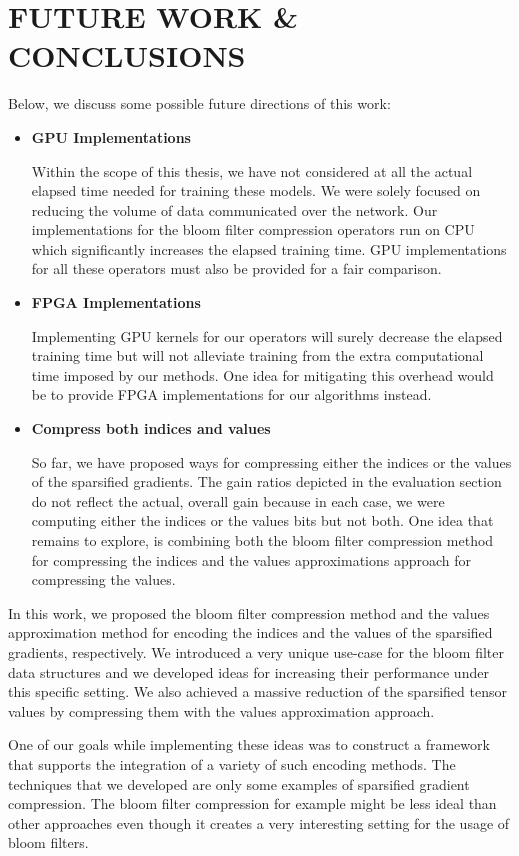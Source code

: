 \chapter{FUTURE WORK \& CONCLUSIONS}

Below, we discuss some possible future directions of this work:
\begin{itemize}

    \item \textbf{GPU Implementations}
    
    Within the scope of this thesis, we have not considered at all the actual elapsed time needed for training these models. We were solely focused on reducing the volume of data communicated over the network.
    Our implementations for the bloom filter compression operators run on CPU which significantly increases the elapsed training time.
    GPU implementations for all these operators must also be provided for a fair comparison.
    
    \item \textbf{FPGA Implementations}
    
    Implementing GPU kernels for our operators will surely decrease the elapsed training time but will not alleviate training from the extra computational time imposed by our methods.
    One idea for mitigating this overhead would be to provide FPGA implementations for our algorithms instead.
    
    \item \textbf{Compress both indices and values} 
    
    So far, we have proposed ways for compressing either the indices or the values of the sparsified gradients. The gain ratios depicted in the evaluation section do not reflect the actual, overall gain because in each case, we were computing either the indices or the values bits but not both.
    One idea that remains to explore, is combining both the bloom filter compression method for compressing the indices and the values approximations approach for compressing the values.
    
\end{itemize}

In this work, we proposed the bloom filter compression method and the values approximation method for encoding the indices and the values of the sparsified gradients, respectively.
We introduced a very unique use-case for the bloom filter data structures and we developed ideas for increasing their performance under this specific setting.
We also achieved a massive reduction of the sparsified tensor values by compressing them with the values approximation approach.

One of our goals while implementing these ideas was to construct a framework that supports the integration of a variety of such encoding methods.
The techniques that we developed are only some examples of sparsified gradient compression.
The bloom filter compression for example might be less ideal than other approaches even though it creates a very interesting setting for the usage of bloom filters.

